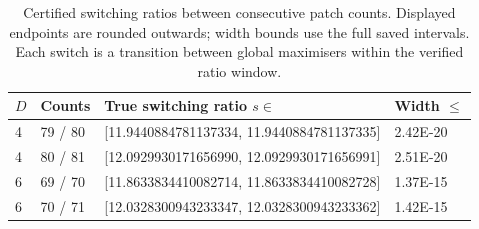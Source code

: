 \begin{table}[htbp]
\centering
\caption{Certified switching ratios between consecutive patch counts. Displayed endpoints are rounded outwards; width bounds use the full saved intervals. Each switch is a transition between global maximisers within the verified ratio window.}
\label{tab:transition_crossings}
\begin{tabular}{llll}
\toprule
$D$ & Counts & True switching ratio $s\in$ & Width $\leq$ \\
\midrule
4 & 79 / 80 & [11.9440884781137334, 11.9440884781137335] & 2.42E-20 \\
4 & 80 / 81 & [12.0929930171656990, 12.0929930171656991] & 2.51E-20 \\
6 & 69 / 70 & [11.8633834410082714, 11.8633834410082728] & 1.37E-15 \\
6 & 70 / 71 & [12.0328300943233347, 12.0328300943233362] & 1.42E-15 \\
\bottomrule
\end{tabular}
\end{table}
